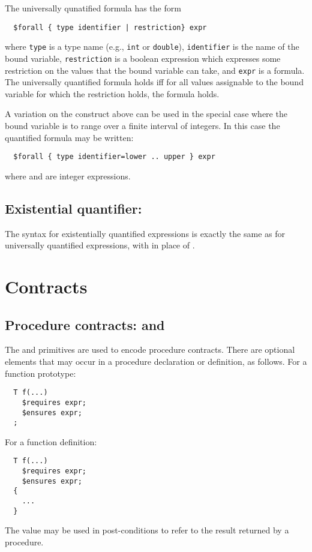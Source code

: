 The universally qunatified formula has the form
\begin{verbatim}
  $forall { type identifier | restriction} expr
\end{verbatim}
where \verb!type! is a type name (e.g., \texttt{int} or
\texttt{double}), \verb!identifier! is the name of the bound variable,
\verb!restriction! is a boolean expression which expresses some
restriction on the values that the bound variable can take, and
\verb!expr! is a formula.  The universally quantified formula
holds iff for all values assignable to the bound variable
for which the restriction holds, the formula  holds.

A variation on the construct above can be used in the special case
where the bound variable is to range over a finite interval
of integers.  In this case the quantified formula may be written:
\begin{verbatim}
  $forall { type identifier=lower .. upper } expr
\end{verbatim}
where  and  are integer expressions.

\subsection{Existential quantifier: \cexists}

The syntax for existentially quantified expressions is exactly the
same as for universally quantified expressions, with \cexists{} in
place of \cforall{}.

\section{Contracts}

\subsection{Procedure contracts: \crequires{} and \censures{}}
The \crequires{} and \censures{} primitives are used to encode
procedure contracts.  There are optional
elements that may occur in a procedure declaration or definition,
as follows.  For a function prototype:
\begin{verbatim}
  T f(...)
    $requires expr;
    $ensures expr;
  ;
\end{verbatim}
For a function definition:
\begin{verbatim}
  T f(...)
    $requires expr;
    $ensures expr;
  {
    ...
  }
\end{verbatim}
The value \cresult{} may be used in post-conditions to refer
to the result returned by a procedure.

